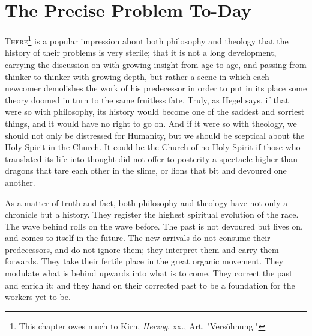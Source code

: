 \documentclass[draft]{ptfdoc}
\begin{document}
\chapter{The Precise Problem To-Day} 

\textsc{There}\footnote{This chapter owes much to Kirn, \textit{Herzog}, xx., Art. "Vers\"{o}hnung."} 
is a popular impression about both 
philosophy and theology that the history 
of their problems is very sterile; that it is 
not a long development, carrying the discussion 
on with growing insight from age to age, and 
passing from thinker to thinker with growing 
depth, but rather a scene in which each newcomer 
demolishes the work of his predecessor 
in order to put in its place some theory doomed 
in turn to the same fruitless fate. Truly, as 
Hegel says, if that were so with philosophy, 
its history would become one of the saddest 
and sorriest things, and it would have no 
right to go on. And if it were so with theology, 
we should not only be distressed for Humanity, 
but we should be sceptical about the Holy Spirit 
in the Church. It could be the Church of 
no Holy Spirit if those who translated its 
life into thought did not offer to posterity a 
spectacle higher than dragons that tare each 
other in the slime, or lions that bit and 
devoured one another. 

As a matter of truth and fact, both philosophy 
and theology have not only a chronicle but a 
history. They register the highest spiritual 
evolution of the race. The wave behind rolls on 
the wave before. The past is not devoured but 
lives on, and comes to itself in the future. The 
new arrivals do not consume their predecessors, 
and do not ignore them; they interpret them 
and carry them forwards. They take their 
fertile place in the great organic movement. 
They modulate what is behind upwards into 
what is to come. They correct the past and 
enrich it; and they hand on their corrected past 
to be a foundation for the workers yet to be. 
\end{document}
